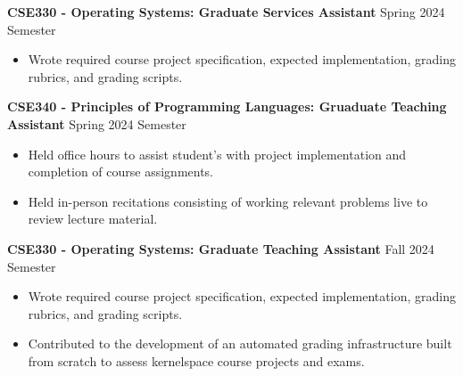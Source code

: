 \textbf{CSE330 - Operating Systems: Graduate Services Assistant} \hfill Spring 2024 Semester
\begin{itemize}
    \item Wrote required course project specification, expected implementation, grading rubrics, and grading scripts.
\end{itemize}
\textbf{CSE340 - Principles of Programming Languages: Gruaduate Teaching Assistant} \hfill Spring 2024 Semester
\begin{itemize}
    \item Held office hours to assist student's with project implementation and completion of course assignments.
    \item Held in-person recitations consisting of working relevant problems live to review lecture material.
\end{itemize}
\textbf{CSE330 - Operating Systems: Graduate Teaching Assistant} \hfill Fall 2024 Semester
\begin{itemize}
    \item Wrote required course project specification, expected implementation, grading rubrics, and grading scripts.
    \item Contributed to the development of an automated grading infrastructure built from scratch to assess kernelspace course projects and exams.
\end{itemize}
